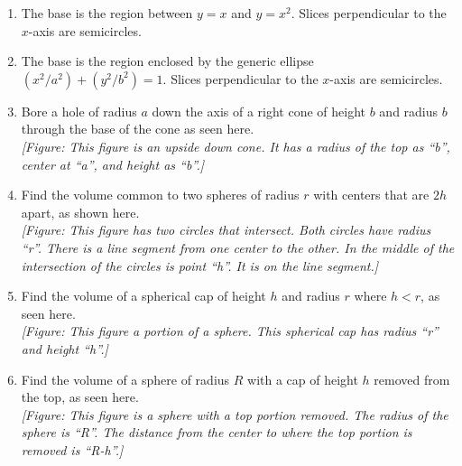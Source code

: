 \documentclass{exercises}
\begin{document}
\begin{enumerate}[resume]
\item The base is the region between $y=x$ and $y=x^{2}$. Slices perpendicular to the $x$-axis are semicircles.
\item The base is the region enclosed by the generic ellipse $(x^{2}/a^{2})+(y^{2}/b^{2})=1$. Slices perpendicular to the $x$-axis are semicircles.
\item Bore a hole of radius $a$ down the axis of a right cone of height $b$ and radius $b$ through the base of the cone as seen here. \\ \textit{[Figure: This figure is an upside down cone. It has a radius of the top as ``b'', center at ``a'', and height as ``b''.]}
\item Find the volume common to two spheres of radius $r$ with centers that are $2h$ apart, as shown here. \\ \textit{[Figure: This figure has two circles that intersect. Both circles have radius ``r''. There is a line segment from one center to the other. In the middle of the intersection of the circles is point ``h''. It is on the line segment.]}
\item Find the volume of a spherical cap of height $h$ and radius $r$ where $h<r$, as seen here. \\ \textit{[Figure: This figure a portion of a sphere. This spherical cap has radius ``r'' and height ``h''.]}
\item Find the volume of a sphere of radius $R$ with a cap of height $h$ removed from the top, as seen here. \\ \textit{[Figure: This figure is a sphere with a top portion removed. The radius of the sphere is ``R''. The distance from the center to where the top portion is removed is ``R-h''.]}
\end{enumerate}
\end{document}
